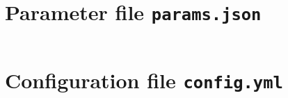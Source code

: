 \documentclass[10pt,a4paper,american]{article}
\begin{document}
\begin{appendix}
  
  \section{Parameter file \texttt{params.json}}
  \label{app:parameter_file}
  {\footnotesize
    \inputminted{json}{params.json}  
  }
  
  \clearpage
  
  \section{Configuration file \texttt{config.yml}}
  \label{app:config_file}
  {\footnotesize
    \inputminted{yaml}{config.yml}  
  }
\end{appendix}

\end{document}
